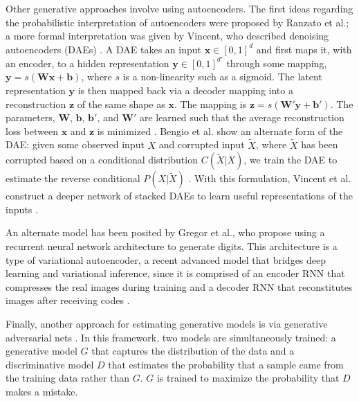 \documentclass[twocolumn]{article}
\begin{document}
Other generative approaches involve using autoencoders. The first ideas regarding the probabilistic interpretation of autoencoders were proposed by Ranzato et al.; a more formal interpretation was given by Vincent, who described denoising autoencoders (DAEs) \cite{marc2007efficient} \cite{vincent2011connection}. A DAE takes an input $\mathbf{x} \in [0,1]^d$ and first maps it, with an encoder, to a hidden representation $\mathbf{y} \in [0,1]^{d'}$ through some mapping, $\mathbf{y} = s(\mathbf{W}\mathbf{x} + \mathbf{b})$, where $s$ is a non-linearity such as a sigmoid. The latent representation $\mathbf{y}$ is then mapped back via a decoder mapping into a reconstruction $\mathbf{z}$ of the same shape as $\mathbf{x}$. The mapping is $\mathbf{z} = s(\mathbf{W}'\mathbf{y} + \mathbf{b}')$. The parameters, $\mathbf{W}$, $\mathbf{b}$, $\mathbf{b}'$, and $\mathbf{W}'$ are learned such that the average reconstruction loss between $\mathbf{x}$ and $\mathbf{z}$ is minimized \cite{deep2016tutorial}. Bengio et al. show an alternate form of the DAE: given some observed input $X$ and corrupted input $\widetilde{X}$, where $\widetilde{X}$ has been corrupted based on a conditional distribution $C(\widetilde{X}|X)$, we train the DAE to estimate the reverse conditional $P(X|\widetilde{X})$ \cite{bengio2013generalized}. With this formulation, Vincent et al. construct a deeper network of stacked DAEs to learn useful representations of the inputs \cite{vincent2010stacked}.

An alternate model has been posited by Gregor et al., who propose using a recurrent neural network architecture to generate digits. This architecture is a type of variational autoencoder, a recent advanced model that bridges deep learning and variational inference, since it is comprised of an encoder RNN that compresses the real images during training and a decoder RNN that reconstitutes images after receiving codes \cite{gregor2015draw}. 

Finally, another approach for estimating generative models is via generative adversarial nets \cite{gauthier2014conditional} \cite{goodfellow2014generative}. In this framework, two models are simultaneously trained: a generative model $G$ that captures the distribution of the data and a discriminative model $D$ that estimates the probability that a sample came from the training data rather than $G$. $G$ is trained to maximize the probability that $D$ makes a mistake. 
\end{document}
